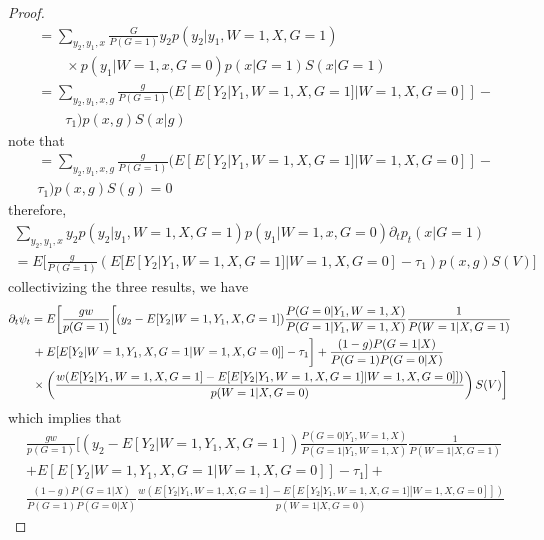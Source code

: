\documentclass{article}
\begin{document}
\begin{proof}
\begin{align*}
&= \sum_ { y_2 , y_1, x}      \frac{ G } { P(G =1 ) }   y_2  p ( y_2| y_1 , W= 1, X , G= 1)\\
&\qquad\times p ( y_1 | W =1 , x, G= 0 ) p( x | G =1 ) S( x | G= 1) \\
&= \sum_ { y_2 , y_1, x, g}      \frac{ g } { P(G =1 ) }   (E[ E[Y_2| Y_1,  W =1, X, G = 1 ] | W =1 , X, G = 0 ]]  - \\
&\qquad \tau_1 ) p( x , g ) S( x | g)
\end{align*}
note that
\begin{align*}
&= \sum_ { y_2 , y_1, x, g}      \frac{ g } { P(G =1 ) }   (E[ E[Y_2| Y_1,  W =1, X, G = 1 ] | W =1 , X, G = 0 ]]  - \\
&\tau_1) p( x , g ) S(  g) = 0
\end{align*}
therefore,
\begin{align*}
\sum_ { y_2 ,y_1,x} y_2  p ( y_2| y_1 , W= 1, X , G= 1) p ( y_1 | W =1 , x, G= 0 ) \partial_t p_t( x | G =1 )\\
= E\biggl[      \frac{ g } { P(G =1 ) }   (E[ E[Y_2| Y_1,  W =1, X, G = 1 ] | W =1 , X, G = 0 ]  - \tau_1 ) p( x , g ) S(  V) \biggr]
\end{align*}
collectivizing the three results, we have
\begin{align*}
&\partial_t \psi_t = E \biggl[  \frac{ g w }{ p(G=1) } \biggl[ (y_2 - E[ Y_2 | W=1 , Y_1 , X, G =1]  ) \frac{ P( G =0 | Y_1 , W=1 , X ) }{ P(G=1 | Y_1 , W=1 , X ) }\frac{1}{P( W=1 | X , G=1)}  \\
& \qquad+ E [ E[ Y_2 | W = 1, Y_1 , X, G =1 | W =1, X, G= 0 ] ] - \tau_1    \biggr]  + \frac{ (1- g) P(G = 1|X)   }{ P(G= 1) P ( G =0 |X) } \\
&\qquad\times\left( \frac{ w ( E [ Y _ 2 | Y_1,W =1 , X, G =1 ] - E [ E[ Y_2 | Y_1, W=1, X, G=1 ] | W =1, X, G= 0 ] ] ) }{ p ( W =1| X, G =0 ) } \right)S(V) \biggr] 
\end{align*}
which implies that
\begin{align*}
&\frac{ g w }{ p(G=1) } \biggl[ (y_2 - E[ Y_2 | W=1 , Y_1 , X, G =1]  ) \frac{ P( G =0 | Y_1 , W=1 , X ) }{ P(G=1 | Y_1 , W=1 , X ) } \frac{1}{P( W=1 | X , G=1)}  \\
&+ E [ E[ Y_2 | W= 1,Y_1 , X, G =1 | W =1, X, G= 0 ] ] - \tau_1    \biggr]  + \\
&\frac{ (1- g) P(G = 1|X)   }{ P(G= 1) P ( G =0 |X) }  \frac{ w ( E [ Y _ 2 | Y_1,W =1 , X, G =1 ] - E [ E[ Y_2 | Y_1, W=1, X, G=1 ] | W =1, X, G= 0 ] ] ) }{ p (W =1| X, G =0 ) }
\end{align*}

\end{proof}
\end{document}

